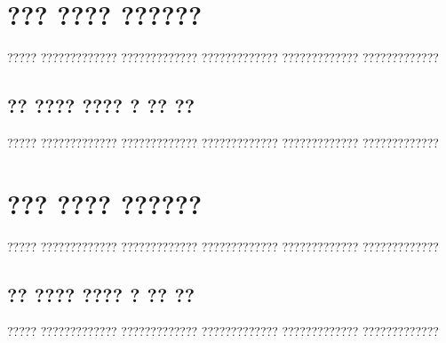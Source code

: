 \documentclass[11pt,english,listoffigures,listoftables]{tfgetsinf}
\begin{document}

\section{}




\chapter{??? ???? ??????}

????? ????????????? ????????????? ????????????? ????????????? ?????????????

\section{?? ???? ???? ? ?? ??}

????? ????????????? ????????????? ????????????? ????????????? ?????????????

\chapter{??? ???? ??????}

????? ????????????? ????????????? ????????????? ????????????? ????????????? 

\section{?? ???? ???? ? ?? ??}

????? ????????????? ????????????? ????????????? ????????????? ?????????????

\end{document}
